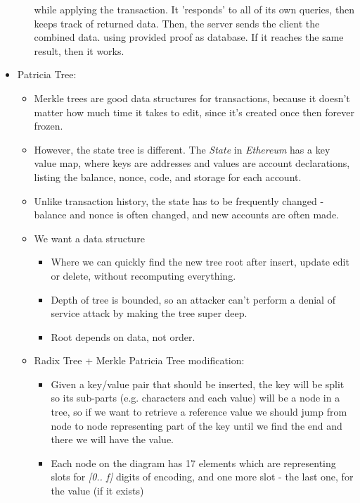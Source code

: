 \documentclass{article}
\begin{document}
\begin{itemize}
\begin{enumerate}
        while applying the transaction. It 'responds' to all of its own queries, then keeps track of returned
        data. Then, the server sends the client the combined data. using provided proof as database. If it reaches
        the same result, then it works.
    \end{enumerate}
  \item Patricia Tree:
    \begin{itemize}
      \item Merkle trees are good data structures for transactions, because it doesn't matter
        how much time it takes to edit, since it's created once then forever frozen.
      \item However, the state tree is different. The \emph{State} in \emph{Ethereum} has a key value map, where keys
        are addresses and values are account declarations, listing the balance, nonce, code, and storage for each account.
      \item Unlike transaction history, the state has to be frequently changed - balance and nonce is often changed, and new accounts
        are often made.
      \item We want a data structure 
        \begin{itemize}
          \item Where we can quickly find the new tree root after insert, update edit or delete, without
            recomputing everything.
          \item Depth of tree is bounded, so an attacker can't perform a denial of service attack by making the tree super deep.
          \item Root depends on data, not order.
        \end{itemize}
    \end{itemize}
    \begin{itemize}
      \item Radix Tree + Merkle Patricia Tree modification:
        \begin{itemize}
          \item Given a key/value pair that should be inserted, the key will be split so its sub-parts (e.g. characters and each value) will be
            a node in a tree, so if we want to retrieve a reference value we should jump from node to node representing part of the key
            until we find the end and there we will have the value.
          \item Each node on the diagram has 17 elements which are representing slots for \emph{[0.. f]} digits of encoding, and one more slot - the last one, for the value (if it exists)\\

\end{itemize}
\end{itemize}
\end{itemize}
\end{document}
